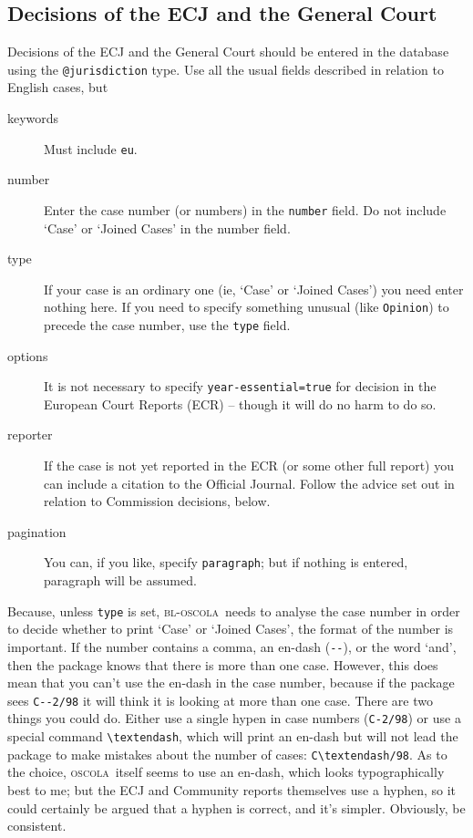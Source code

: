\documentclass[a4paper,
               11pt,
	       DIV=1,			   
	       footinclude=false]
	      {scrartcl}
\newcommand{\oscola}{\textsc{bl-oscola}}
\newcommand{\oscolashort}{\textsc{oscola}\nocite{oscola}}
\begin{document}
\subsection{Decisions of the ECJ and the General Court}
Decisions of the ECJ and the General Court should be entered in the
database using the \texttt{@jurisdiction} type. Use all the usual
fields described in relation to English cases, but
\begin{description}
\item[keywords] Must include \texttt{eu}.
\item[number]
  Enter the case number (or numbers) in the
  \texttt{number} field. Do not include `Case' or `Joined Cases' in the number field.
\item[type] If your case is an ordinary one (ie, `Case' or `Joined
  Cases') you need enter nothing here. If you need to specify
  something unusual (like \texttt{Opinion}) to precede the case
  number, use the \texttt{type} field.
\item[options] It is not necessary to specify
  \texttt{year-essential=true} for decision in the European Court
  Reports (ECR) -- though it will do no harm to do so.
\item[reporter] If the case is not yet reported in the ECR (or
  some other full report) you can include a citation to the Official
  Journal. Follow the advice set out in relation to Commission
  decisions, below.
\item[pagination] You can, if you like, specify \texttt{paragraph};
  but if nothing is entered, paragraph will be assumed.
\end{description}

Because, unless \texttt{type} is set, \oscola\ needs to analyse the
case number in order to decide whether to print `Case' or `Joined
Cases', the format of the number is important. If the number contains
a comma, an en-dash (\verb|--|), or the word `and', then the package
knows that there is more than one case. However, this does mean that
you can't use the en-dash in the case number, because if the package
sees \verb|C--2/98| it will think it is looking at more than one
case. There are two things you could do. Either use a single hypen in
case numbers (\texttt{C-2/98}) or use a special command
\verb|\textendash|, which will print an en-dash but will not lead
the package to make mistakes about the number of cases:
\verb|C\textendash/98|. As to the choice, \oscolashort\ itself seems to use
an en-dash, which looks typographically best to me; but the ECJ and
Community reports themselves use a hyphen, so it could certainly be
argued that a hyphen is correct, and it's simpler. Obviously, be
consistent.
\end{document}
